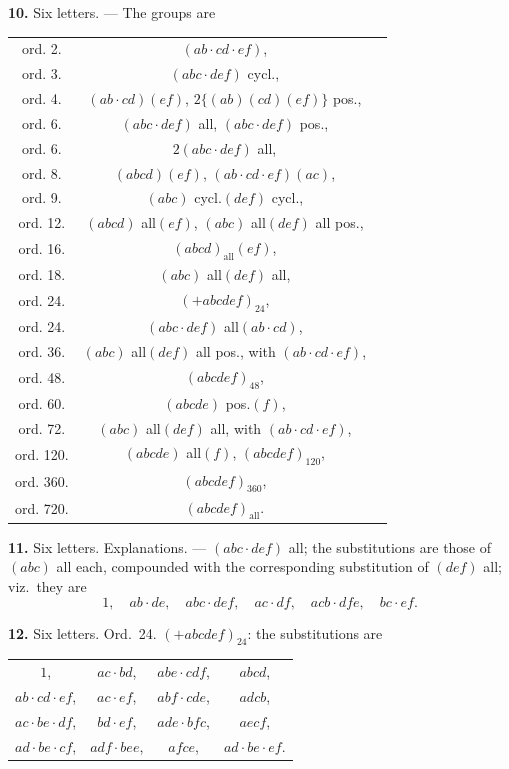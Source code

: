 \documentclass[11pt,a4paper]{book}
\begin{document}
\vspace{0.5em}
\textbf{10.} Six letters. --- The groups are
\begin{center}
\begin{tabular}{ccl}
ord.  2. & $(ab \cdot cd \cdot ef)$, \\
ord.  3. & $(abc \cdot def)$ cycl., \\
ord.  4. & $(ab \cdot cd)(ef)$, \quad $2\{(ab)(cd)(ef)\}$ pos., \\
ord.  6. & $(abc \cdot def)$ all, \quad $(abc \cdot def)$ pos., \\
ord.  6. & $2(abc \cdot def)$ all, \\
ord.  8. & $(abcd)(ef)$, \quad $(ab \cdot cd \cdot ef)(ac)$, \\
ord.  9. & $(abc)$ cycl.$(def)$ cycl., \\
ord. 12. & $(abcd)$ all$(ef)$, \quad $(abc)$ all$(def)$ all pos., \\
ord. 16. & $(abcd)_{\text{all}}(ef)$, \\
ord. 18. & $(abc)$ all$(def)$ all, \\
ord. 24. & $(+abcdef)_{24}$, \\
ord. 24. & $(abc \cdot def)$ all$(ab \cdot cd)$, \\
ord. 36. & $(abc)$ all$(def)$ all pos., with $(ab \cdot cd \cdot ef)$, \\
ord. 48. & $(abcdef)_{48}$, \\
ord. 60. & $(abcde)$ pos.$(f)$, \\
ord. 72. & $(abc)$ all$(def)$ all, with $(ab \cdot cd \cdot ef)$, \\
ord. 120. & $(abcde)$ all$(f)$, \quad $(abcdef)_{120}$, \\
ord. 360. & $(abcdef)_{360}$, \\
ord. 720. & $(abcdef)_{\text{all}}$.
\end{tabular}
\end{center}

\vspace{0.5em}
\textbf{11.} Six letters. Explanations. --- $(abc \cdot def)$ all; the substitutions are those of $(abc)$ all each, compounded with the corresponding substitution of $(def)$ all; viz.\ they are
\[
1, \quad ab \cdot de, \quad abc \cdot def, \quad ac \cdot df, \quad acb \cdot dfe, \quad bc \cdot ef.
\]

\vspace{0.5em}
\textbf{12.} Six letters. Ord.~24. $(+abcdef)_{24}$: the substitutions are
\begin{center}
\begin{tabular}{cccc}
$1$, & $ac \cdot bd$, & $abe \cdot cdf$, & $abcd$, \\
$ab \cdot cd \cdot ef$, & $ac \cdot ef$, & $abf \cdot cde$, & $adcb$, \\
$ac \cdot be \cdot df$, & $bd \cdot ef$, & $ade \cdot bfc$, & $aecf$, \\
$ad \cdot be \cdot cf$, & $adf \cdot bee$, & $afce$, & $ad \cdot be \cdot ef$.
\end{tabular}
\end{center}
\end{document}
